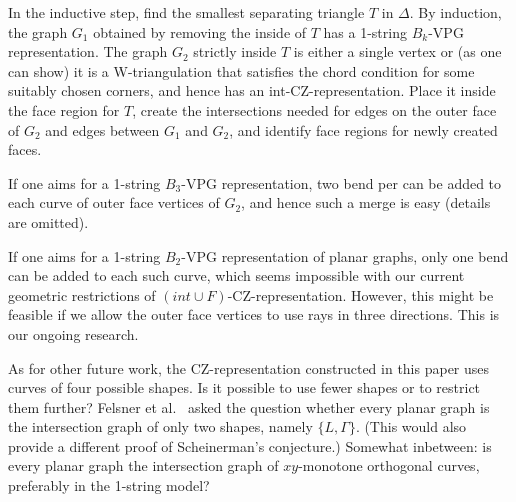 \documentclass{article}
\renewcommand{\int}[1]{$(\mathit{int}\cup{#1})$}
\begin{document}
In the inductive step, find the smallest separating triangle $T$ in $\Delta$.
By induction, the graph $G_1$ obtained by removing the inside of
$T$ has a 1-string $B_k$-VPG representation. 
The graph $G_2$ strictly inside $T$ is either a single vertex or (as one
can show) it is a W-triangulation that satisfies the chord condition for
some suitably chosen corners, and hence has an int-CZ-representation.
Place it inside the face region for $T$,
create the intersections needed for edges on the outer face of $G_2$ and
edges between $G_1$ and $G_2$, and
identify face regions for newly created faces.

If one aims for a 1-string $B_3$-VPG representation, two bend per
can be added to each curve of outer face vertices of $G_2$, and hence 
such a merge is easy (details are omitted).

If one aims for a 1-string $B_2$-VPG representation of planar
graphs, only one bend can be added to each such curve, 
which seems impossible with our current 
geometric restrictions of \int{F}-CZ-representation. 
However, this might be feasible
if we allow the outer face vertices 
to use rays in three directions. This is our ongoing research.


\medskip
As for other future work,
the CZ-representation constructed in this paper uses curves of four possible shapes.
Is it possible to use fewer shapes or to restrict them further?  
Felsner et al.~\cite{cit:mfcs} asked the question whether every planar
graph is the intersection graph of only two shapes, namely $\{L,\Gamma\}$.
(This would also provide a different proof of Scheinerman's conjecture.)
Somewhat inbetween: is every planar graph the intersection graph of
$xy$-monotone orthogonal curves, preferably in the 1-string model?


{}

\end{document}
